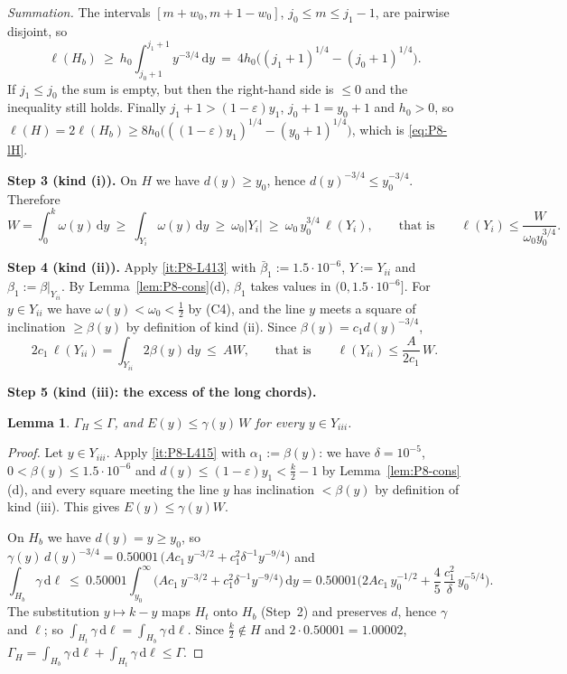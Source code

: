 \documentclass[11pt]{amsart}
\newcommand{\eps}{\varepsilon}
\newcommand{\dd}{\,\mathrm d}
\newtheorem{lemma}[theorem]{Lemma}
\theoremstyle{definition}
\theoremstyle{remark}
\numberwithin{equation}{section}
\begin{document}
\emph{Summation.} The intervals $[m+w_0,m+1-w_0]$, $j_0\le m\le j_1-1$, are pairwise disjoint, so
\[
\ell(H_b)\ \ge\ h_0\int_{j_0+1}^{j_1+1}y^{-3/4}\dd y\ =\ 4h_0\Big((j_1+1)^{1/4}-(j_0+1)^{1/4}\Big).
\]
If $j_1\le j_0$ the sum is empty, but then the right-hand side is $\le0$ and the inequality still holds. Finally
$j_1+1>(1-\eps)y_1$, $j_0+1=y_0+1$ and $h_0>0$, so $\ell(H)=2\ell(H_b)\ge8h_0\big(((1-\eps)y_1)^{1/4}-(y_0+1)^{1/4}\big)$,
which is \eqref{eq:P8-lH}.

\medskip\noindent\textbf{Step 3 (kind (i)).}
On $H$ we have $d(y)\ge y_0$, hence $d(y)^{-3/4}\le y_0^{-3/4}$. Therefore
\[
W=\int_0^k\omega(y)\dd y\ \ge\ \int_{Y_i}\omega(y)\dd y\ \ge\ \omega_0|Y_i|\ \ge\ \omega_0\,y_0^{3/4}\,\ell(Y_i),
\qquad\text{that is}\qquad \ell(Y_i)\le\frac{W}{\omega_0y_0^{3/4}} .
\]

\medskip\noindent\textbf{Step 4 (kind (ii)).}
Apply \ref{it:P8-L413} with $\bar\beta_1:=1.5\cdot10^{-6}$, $Y:=Y_{ii}$ and $\beta_1:=\beta|_{Y_{ii}}$. By
Lemma~\ref{lem:P8-cons}(d), $\beta_1$ takes values in $(0,1.5\cdot10^{-6}]$. For $y\in Y_{ii}$ we have
$\omega(y)<\omega_0<\frac12$ by (C4), and the line $y$ meets a square of inclination $\ge\beta(y)$ by definition of
kind (ii). Since $\beta(y)=c_1d(y)^{-3/4}$,
\[
2c_1\,\ell(Y_{ii})=\int_{Y_{ii}}2\beta(y)\dd y\ \le\ AW,\qquad\text{that is}\qquad \ell(Y_{ii})\le\frac{A}{2c_1}\,W .
\]

\medskip\noindent\textbf{Step 5 (kind (iii): the excess of the long chords).}

\begin{lemma}\label{lem:P8-Gamma}
$\Gamma_H\le\Gamma$, and $E(y)\le\gamma(y)\,W$ for every $y\in Y_{iii}$.
\end{lemma}

\begin{proof}
Let $y\in Y_{iii}$. Apply \ref{it:P8-L415} with $\alpha_1:=\beta(y)$: we have $\delta=10^{-5}$,
$0<\beta(y)\le1.5\cdot10^{-6}$ and $d(y)\le(1-\eps)y_1<\frac k2-1$ by Lemma~\ref{lem:P8-cons}(d), and every square meeting
the line $y$ has inclination $<\beta(y)$ by definition of kind (iii). This gives $E(y)\le\gamma(y)W$.

On $H_b$ we have $d(y)=y\ge y_0$, so
$\gamma(y)\,d(y)^{-3/4}=0.50001\,\big(Ac_1\,y^{-3/2}+c_1^2\delta^{-1}y^{-9/4}\big)$ and
\[
\int_{H_b}\gamma\dd\ell\ \le\ 0.50001\int_{y_0}^{\infty}\big(Ac_1\,y^{-3/2}+c_1^2\delta^{-1}y^{-9/4}\big)\dd y
=0.50001\Big(2Ac_1\,y_0^{-1/2}+\frac45\,\frac{c_1^2}{\delta}\,y_0^{-5/4}\Big).
\]
The substitution $y\mapsto k-y$ maps $H_t$ onto $H_b$ (Step~2) and preserves $d$, hence $\gamma$ and $\ell$; so
$\int_{H_t}\gamma\dd\ell=\int_{H_b}\gamma\dd\ell$. Since $\frac k2\notin H$ and $2\cdot0.50001=1.00002$,
$\Gamma_H=\int_{H_b}\gamma\dd\ell+\int_{H_t}\gamma\dd\ell\le\Gamma$.
\end{proof}
\end{document}
